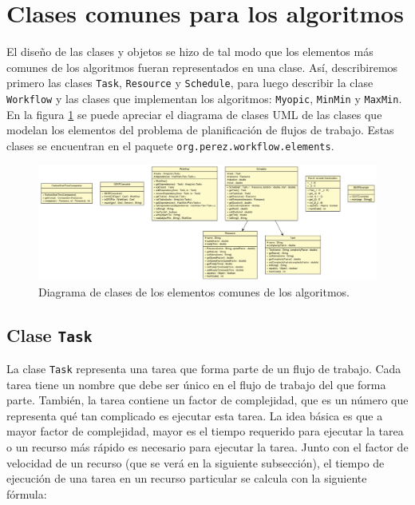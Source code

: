 \section{Clases comunes para los algoritmos}
El diseño de las clases y objetos se hizo de tal modo que los elementos más comunes de los algoritmos fueran representados en una clase. Así, describiremos primero las clases \texttt{Task}, \texttt{Resource} y \texttt{Schedule}, para luego describir la clase \texttt{Workflow} y las clases que implementan los algoritmos: \texttt{Myopic}, \texttt{MinMin} y \texttt{MaxMin}. En la figura \ref{fig:uml_class} se puede apreciar el diagrama de clases UML de las clases que modelan los elementos del problema de planificación de flujos de trabajo. Estas clases se encuentran en el paquete \texttt{org.perez.workflow.elements}.

\begin{figure}
\label{fig:uml_class}
\begin{center}
\includegraphics[width=1.0\textwidth]{imagenes/uml_class}
\end{center}
\caption{Diagrama de clases de los elementos comunes de los algoritmos.}
\end{figure}

\subsection{Clase \texttt{Task}}
La clase \texttt{Task} representa una tarea que forma parte de un flujo de trabajo. Cada tarea tiene un nombre que debe ser único en el flujo de trabajo del que forma parte. También, la tarea contiene un factor de complejidad, que es un número que representa qué tan complicado es ejecutar esta tarea. La idea básica es que a mayor factor de complejidad, mayor es el tiempo requerido para ejecutar la tarea o un recurso más rápido es necesario para ejecutar la tarea. Junto con el factor de velocidad de un recurso (que se verá en la siguiente subsección), el tiempo de ejecución de una tarea en un recurso particular se calcula con la siguiente fórmula:

